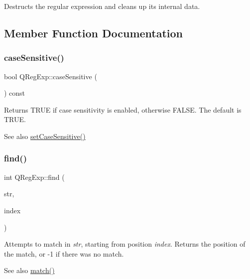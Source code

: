 Destructs the regular expression and cleans up its internal data. 

\subsection{Member Function Documentation}
\mbox{\label{class_q_reg_exp_ae1e5a7363426ebf095c2312ad5472a35}} 
\subsubsection{\texorpdfstring{caseSensitive()}{caseSensitive()}}
{\footnotesize\ttfamily bool Q\+Reg\+Exp\+::case\+Sensitive (\begin{DoxyParamCaption}{ }\end{DoxyParamCaption}) const\hspace{0.3cm}{\ttfamily [inline]}}

Returns T\+R\+UE if case sensitivity is enabled, otherwise F\+A\+L\+SE. The default is T\+R\+UE.

\begin{DoxySeeAlso}{See also}
\mbox{\hyperlink{class_q_reg_exp_a99dd9f410cfa14efda7990bac1fd089e}{set\+Case\+Sensitive()}} 
\end{DoxySeeAlso}
\mbox{\label{class_q_reg_exp_af38e38dccf74a21a3c699cc203f19878}} 
\subsubsection{\texorpdfstring{find()}{find()}}
{\footnotesize\ttfamily int Q\+Reg\+Exp\+::find (\begin{DoxyParamCaption}\item[{const \mbox{\hyperlink{class_q_c_string}{Q\+C\+String}} \&}]{str,  }\item[{int}]{index }\end{DoxyParamCaption})\hspace{0.3cm}{\ttfamily [inline]}}

Attempts to match in {\itshape str}, starting from position {\itshape index}. Returns the position of the match, or -\/1 if there was no match.

\begin{DoxySeeAlso}{See also}
\mbox{\hyperlink{class_q_reg_exp_a7eef4b63ebbda0a41251f2159f288ab9}{match()}} 
\end{DoxySeeAlso}
\mbox{\label{class_q_reg_exp_a184d946c8dc57a15952b7ac21af2fbed}} 
